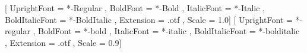 \usepackage[
    b5paper,
    bindingoffset=.425in,
    left=.5in,
    right=.5in,
    top=.8125in,
    bottom=.9375in,
]{geometry}
\usepackage{wrapfig}                %
\usepackage[toc]{multitoc}          %
\usepackage{mdwlist}                %
\usepackage{subfig}                 %
\usepackage{perpage}                %


\usepackage{amsmath} %
\usepackage{
    amsthm,
    amsfonts,
    amssymb,
    slashed,
    url,
    graphicx
}
\usepackage{xeCJKfntef} %
\usepackage{extarrows}  %
\usepackage{makecell} %

\newcommand{\oversetmy}[2]{\overset{\mathclap{\scriptscriptstyle #1}}{#2}\vphantom{#2}}

\usepackage[no-math]{fontspec}
\setmainfont{TeXGyreTermesX}[
    UprightFont = *-Regular ,
    BoldFont = *-Bold ,
    ItalicFont = *-Italic ,
    BoldItalicFont = *-BoldItalic ,
    Extension = .otf ,
    Scale = 1.0]
\setsansfont{texgyreheros}[
    UprightFont = *-regular ,
    BoldFont = *-bold ,
    ItalicFont = *-italic ,
    BoldItalicFont = *-bolditalic ,
    Extension = .otf ,
    Scale = 0.9]

\usepackage[fontset=none]{ctex}

